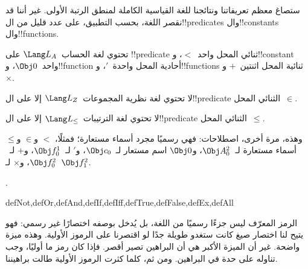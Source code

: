 \documentclass[../../../include/open-logic-section]{subfiles}
\begin{document}
ستصاغ معظم تعريفاتنا ونتائجنا للغة القياسية الكاملة لمنطق الرتبة
الأولى. غير أننا قد نقصر اللغة، بحسب التطبيق، على عدد قليل من
ال!!{predicate}s وال!!{constant}s وال!!{function}s.

\begin{ex}
تحتوي لغة الحساب~$\Lang L_A$ على !!{predicate} ثنائي المحل واحد~$<$،
و!!{constant} واحد~$\Obj 0$، و!!{function} أحادية المحل واحدة~$\prime$،
و!!{function}s ثنائية المحل اثنتين~$+$ و~$\times$.
\end{ex}

\begin{ex}
لا تحتوي لغة نظرية المجموعات~$\Lang L_Z$ إلا على
ال!!{predicate} الثنائي المحل~$\in$.
\end{ex}

\begin{ex}
لا تحتوي لغة الترتيبات~$\Lang L_\le$ إلا على
ال!!{predicate} الثنائي المحل~$\le$.
\end{ex}

وهذه، مرة أخرى، اصطلاحات: فهي رسميًا مجرد أسماء مستعارة؛ فمثلًا، $<$
و$\in$ و$\le$ أسماء مستعارة لـ~$\Obj A^2_0$، و$\Obj 0$ اسم مستعار
لـ~$\Obj c_0$، و$\prime$ لـ~$\Obj f^1_0$، و$+$ لـ~$\Obj f^2_0$،
و$\times$ لـ~$\Obj f^2_1$.

.

\begin{tagblock}{defNot,defOr,defAnd,defIf,defIff,defTrue,defFalse,defEx,defAll}
\begin{explain}
الرمز المعرّف ليس جزءًا رسميًا من اللغة، بل يُدخل بوصفه اختصارًا غير
رسمي: فهو يتيح لنا اختصار صيغ كانت ستغدو طويلة جدًا لو اقتصرنا على
الرموز الأولية. وهذه ميزة واضحة. غير أن الميزة الأكبر هي أن البراهين
تصير أقصر. فإذا كان رمز ما أوليًا، وجب تناوله على حدة في البراهين.
ومن ثم، كلما كثرت الرموز الأولية طالت براهيننا.
\end{explain}
\end{tagblock}
\end{document}
